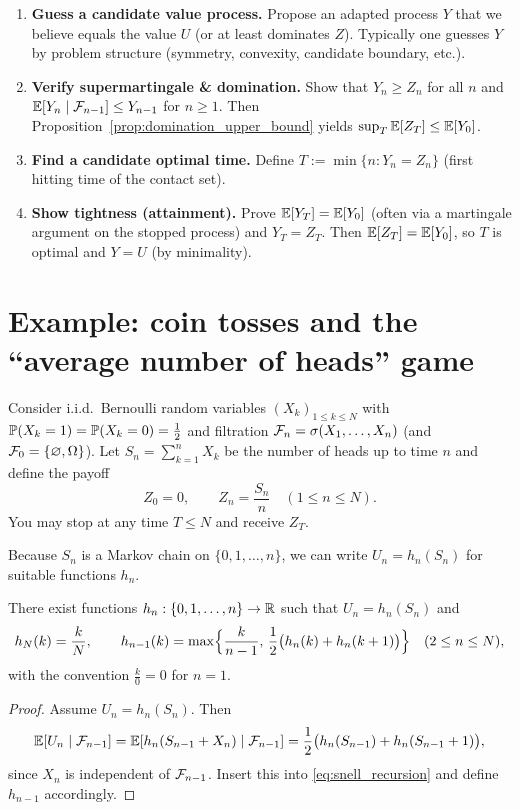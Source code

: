 \begin{enumerate}[label=\textbf{Step \arabic*.}]
\item \textbf{Guess a candidate value process.}
Propose an adapted process $Y$ that we believe equals the value $U$ (or at least dominates $Z$).
Typically one guesses $Y$ by problem structure (symmetry, convexity, candidate boundary, etc.).
\item \textbf{Verify supermartingale \& domination.}
Show that $Y_n\ge Z_n$ for all $n$ and $\mathbb{E}[Y_n\mid\mathcal{F}_{n-1}]\le Y_{n-1}$ for $n\ge 1$.
Then Proposition~\ref{prop:domination_upper_bound} yields $\sup_T\mathbb{E}[Z_T]\le \mathbb{E}[Y_0]$.
\item \textbf{Find a candidate optimal time.}
Define $T:=\min\{n: Y_n=Z_n\}$ (first hitting time of the contact set).
\item \textbf{Show tightness (attainment).}
Prove $\mathbb{E}[Y_T]=\mathbb{E}[Y_0]$ (often via a martingale argument on the stopped process) and $Y_T=Z_T$.
Then $\mathbb{E}[Z_T]=\mathbb{E}[Y_0]$, so $T$ is optimal and $Y=U$ (by minimality).
\end{enumerate}

\section{Example: coin tosses and the ``average number of heads'' game}

Consider i.i.d.\ Bernoulli random variables $(X_k)_{1\le k\le N}$ with
$\mathbb{P}(X_k=1)=\mathbb{P}(X_k=0)=\tfrac12$ and filtration $\mathcal{F}_n=\sigma(X_1,\dots,X_n)$ (and $\mathcal{F}_0=\{\varnothing,\Omega\}$).
Let $S_n=\sum_{k=1}^n X_k$ be the number of heads up to time $n$ and define the payoff
\[
Z_0=0,\qquad Z_n=\frac{S_n}{n}\quad(1\le n\le N).
\]
You may stop at any time $T\le N$ and receive $Z_T$.

\medskip
Because $S_n$ is a Markov chain on $\{0,1,\dots,n\}$, we can write $U_n=h_n(S_n)$ for suitable
functions $h_n$.

\begin{proposition}
There exist functions $h_n:\{0,1,\dots,n\}\to\mathbb{R}$ such that $U_n=h_n(S_n)$ and
\[
h_N(k)=\frac{k}{N},\qquad
h_{n-1}(k)=\max\Bigl\{\frac{k}{n-1},\,\frac12\bigl(h_n(k)+h_n(k+1)\bigr)\Bigr\}
\quad (2\le n\le N),
\]
with the convention $\frac{k}{0}=0$ for $n=1$.
\end{proposition}

\begin{proof}
Assume $U_n=h_n(S_n)$. Then
\[
\mathbb{E}[U_n\mid \mathcal{F}_{n-1}]
=\mathbb{E}[h_n(S_{n-1}+X_n)\mid \mathcal{F}_{n-1}]
=\frac12\bigl(h_n(S_{n-1})+h_n(S_{n-1}+1)\bigr),
\]
since $X_n$ is independent of $\mathcal{F}_{n-1}$. Insert this into \eqref{eq:snell_recursion} and define $h_{n-1}$
accordingly.
\end{proof}

